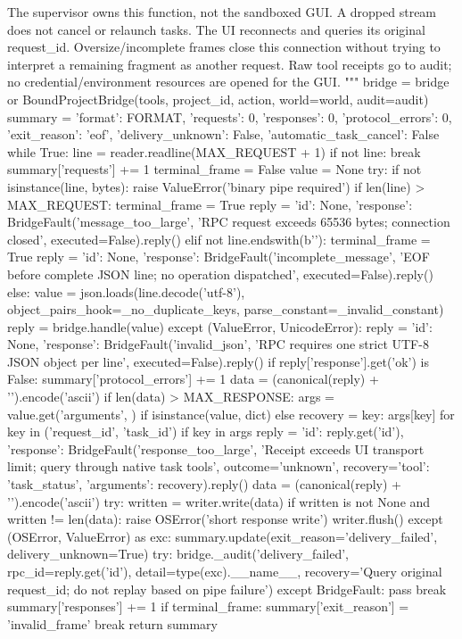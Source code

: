     The supervisor owns this function, not the sandboxed GUI. A dropped stream
    does not cancel or relaunch tasks. The UI reconnects and queries its original
    request_id. Oversize/incomplete frames close this connection without trying
    to interpret a remaining fragment as another request. Raw tool receipts go
    to audit; no credential/environment resources are opened for the GUI.
    """
    bridge = bridge or BoundProjectBridge(tools, project_id, action, world=world, audit=audit)
    summary = {'format': FORMAT, 'requests': 0, 'responses': 0, 'protocol_errors': 0,
               'exit_reason': 'eof', 'delivery_unknown': False, 'automatic_task_cancel': False}
    while True:
        line = reader.readline(MAX_REQUEST + 1)
        if not line:
            break
        summary['requests'] += 1
        terminal_frame = False
        value = None
        try:
            if not isinstance(line, bytes):
                raise ValueError('binary pipe required')
            if len(line) > MAX_REQUEST:
                terminal_frame = True
                reply = {'id': None, 'response': BridgeFault('message_too_large', 'RPC request exceeds 65536 bytes; connection closed', executed=False).reply()}
            elif not line.endswith(b'\n'):
                terminal_frame = True
                reply = {'id': None, 'response': BridgeFault('incomplete_message', 'EOF before complete JSON line; no operation dispatched', executed=False).reply()}
            else:
                value = json.loads(line.decode('utf-8'), object_pairs_hook=_no_duplicate_keys, parse_constant=_invalid_constant)
                reply = bridge.handle(value)
        except (ValueError, UnicodeError):
            reply = {'id': None, 'response': BridgeFault('invalid_json', 'RPC requires one strict UTF-8 JSON object per line', executed=False).reply()}
        if reply['response'].get('ok') is False:
            summary['protocol_errors'] += 1
        data = (canonical(reply) + '\n').encode('ascii')
        if len(data) > MAX_RESPONSE:
            args = value.get('arguments', {}) if isinstance(value, dict) else {}
            recovery = {key: args[key] for key in ('request_id', 'task_id') if key in args}
            reply = {'id': reply.get('id'), 'response': BridgeFault('response_too_large', 'Receipt exceeds UI transport limit; query through native task tools',
                      outcome='unknown', recovery={'tool': 'task_status', 'arguments': recovery}).reply()}
            data = (canonical(reply) + '\n').encode('ascii')
        try:
            written = writer.write(data)
            if written is not None and written != len(data):
                raise OSError('short response write')
            writer.flush()
        except (OSError, ValueError) as exc:
            summary.update(exit_reason='delivery_failed', delivery_unknown=True)
            try: bridge._audit('delivery_failed', rpc_id=reply.get('id'), detail=type(exc).__name__, recovery='Query original request_id; do not replay based on pipe failure')
            except BridgeFault: pass
            break
        summary['responses'] += 1
        if terminal_frame:
            summary['exit_reason'] = 'invalid_frame'
            break
    return summary


